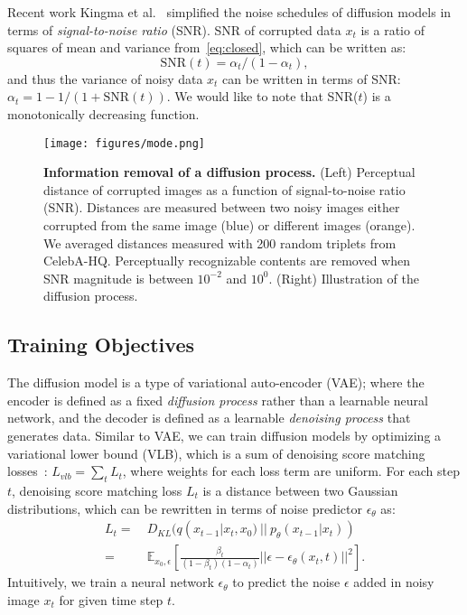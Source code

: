 Recent work Kingma et al.~\cite{kingma2021variational} simplified the noise schedules of diffusion models in terms of \textit{signal-to-noise ratio} (SNR). SNR of corrupted data $x_t$ is a ratio of squares of mean and variance from~\cref{eq:closed}, which can be written as:
\begin{equation}\label{eq:snr}
\text{SNR}(t)=\alpha _{t}/(1-\alpha _{t}),
\end{equation}
and thus the variance of noisy data $x_t$ can be written in terms of SNR: $\alpha _t= 1 - 1/(1+\text{SNR}(t))$. We would like to note that SNR($t$) is a monotonically decreasing function.

\begin{figure*}[t!]
  \centering
  \texttt{[image: figures/mode.png]}
  \caption{\textbf{Information removal of a diffusion process.} (Left) Perceptual distance of corrupted images as a function of signal-to-noise ratio (SNR). Distances are measured between two noisy images either corrupted from the same image (blue) or different images (orange). 
  We averaged distances measured with 200 random triplets from CelebA-HQ. 
  Perceptually recognizable contents are removed when SNR magnitude is between $10^{-2}$ and $10^0$. %
  (Right) Illustration of the diffusion process.}
  \label{fig:mode}
\end{figure*}

\subsection{Training Objectives}
\label{sec:objective}
The diffusion model is a type of variational auto-encoder (VAE); where the encoder is defined as a fixed \textit{diffusion process} rather than a learnable neural network, and the decoder is defined as a learnable \textit{denoising process} that generates data. Similar to VAE, we can train diffusion models by optimizing a variational lower bound (VLB), which is a sum of denoising score matching losses~\cite{vincent2011connection}: $L_{vlb}=\sum_t L_t$, where weights for each loss term are uniform. For each step $t$, denoising score matching loss $L_t$ is a distance between two Gaussian distributions, which can be rewritten in terms of noise predictor $\epsilon_\theta$ as:
\begin{align}\label{eq:vlb}
L_{t}=~&D_{KL}(q(x_{t-1}|x_t,x_0)~||~p_\theta(x_{t-1}|x_t))  \nonumber \\
=~&\mathbb{E}_{x_0,\epsilon}[\frac{\beta _t}{(1-\beta _t)(1
-\alpha _t)}||\epsilon-\epsilon_\theta(x_t, t)||^2].
\end{align}
Intuitively, we train a neural network $\epsilon _\theta$ to predict the noise $\epsilon$ added in noisy image $x_t$ for given time step $t$.

